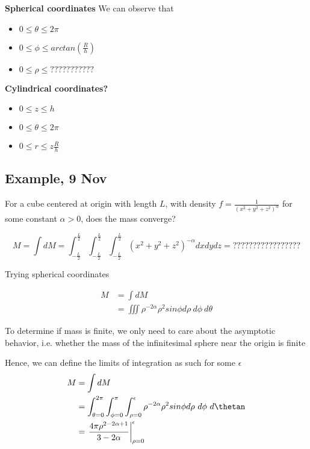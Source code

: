 \textbf{Spherical coordinates}
We can observe that
\begin{itemize}
   \item $0 \leq \theta \leq 2 \pi$ 
   \item $0 \leq \phi \leq arctan \left(  \frac{R}{h} \right) $ 
   \item $ 0 \leq \rho \leq ???????????$
\end{itemize}

\textbf{Cylindrical coordinates?}
\begin{itemize}
   \item $ 0 \leq z \leq h$ 
   \item $ 0 \leq \theta \leq 2 \pi$ 
   \item $ 0 \leq r \leq z \frac{R}{h}$ 
\end{itemize}

\subsection{Example, 9 Nov}

For a cube centered at origin with length $L$, with density $f = \frac{1}{ \left( x^2 + y^2 + z^2  \right)^{\alpha}}$ for some constant $\alpha > 0$, does the mass converge?

\[
   M = \int dM = \int_{- \frac{L}{2}}^{ \frac{L}{2}}   \int_{- \frac{L}{2}}^{ \frac{L}{2}}\int_{- \frac{L}{2}}^{ \frac{L}{2}} \left( x^2 + y^2 + z^2 \right)^{- \alpha} dx dy dz = ?????????????????
\] 

Trying spherical coordinates

\begin{align*}
   M &= \int dM \\ 
     &= \iiint \rho^{- 2 \alpha} \rho^2 sin \phi d \rho\ d \phi\ d \theta
\end{align*}

To determine if mass is finite, we only need to care about the asymptotic behavior, i.e. whether the mass of the infinitesimal sphere near the origin is finite

Hence, we can define the limits of integration as such for some $ \epsilon$
\begin{align*}
   M &= \int dM \\ 
     &= \int_{ \theta = 0}^{2\pi} \int_{ \phi = 0}^{\pi} \int_{\rho = 0}^{\epsilon}     \rho^{- 2 \alpha} \rho^2 sin \phi d \rho\ d \phi\ d \thetan \\
     &= \left. \frac{4 \pi \rho^{2 - 2\alpha + 1}}{3 - 2 \alpha
        } \right|_{\rho = 0}^{\epsilon} 
\end{align*}

